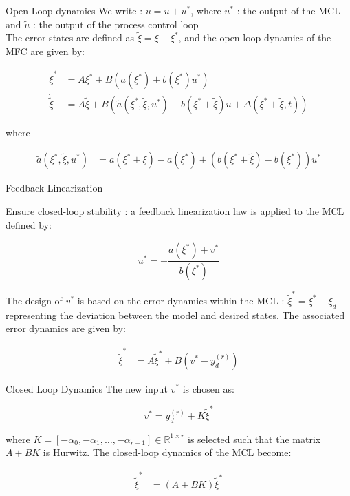 \begin{frame}{Open Loop dynamics}
    We write :  \(u = \tilde{u} + u^*\), where \(u^*\) : the output of the MCL and \(\tilde{u}\) : the output of the process control loop \\
    The error states are defined as \(\tilde{\xi} = \xi - \xi^*\), and the open-loop dynamics of the MFC are given by:

\begin{align}
\dot{\xi}^* &= A\xi^* + B \left( a(\xi^*) + b(\xi^*) u^* \right) \\
\dot{\tilde{\xi}} &= A\tilde{\xi} + B \left( \tilde{a}(\xi^*, \tilde{\xi}, u^*) + b(\xi^* + \tilde{\xi}) \tilde{u} + \Delta(\xi^* + \tilde{\xi}, t)  \right)
\end{align}

where

\begin{align}
\tilde{a}(\xi^*, \tilde{\xi}, u^*) &= a(\xi^* + \tilde{\xi}) - a(\xi^*) + \left( b(\xi^* + \tilde{\xi}) - b(\xi^*) \right) u^*
\end{align}


\end{frame}


\begin{frame}{Feedback Linearization}
    
Ensure closed-loop stability : a feedback linearization law is applied to the MCL  defined by:

\begin{equation}
\label{eq:MCL_control_law}
u^* = -\frac{a(\xi^*) + v^*}{b(\xi^*)}
\end{equation}

The design of \(v^*\) is based on the error dynamics within the MCL : \(\tilde{\xi}^* = \xi^* - \xi_d\) representing the deviation between the model and desired states. The associated error dynamics are given by:

\begin{align}
\dot{\tilde{\xi}}^* &= A\tilde{\xi}^* + B(v^* - y_d^{(r)})
\end{align}

\end{frame}



\begin{frame}{Closed Loop Dynamics}
The new input \(v^*\) is chosen as:

\begin{equation}
v^* = y_d^{(r)} + K\tilde{\xi}^*
\end{equation}

where \(K = [-\alpha_0, -\alpha_1, \ldots, -\alpha_{r-1}] \in \mathbb{R}^{1 \times r}\) is selected such that the matrix \(A + BK\) is Hurwitz. The closed-loop dynamics of the MCL become:

\begin{align}
\dot{\tilde{\xi}}^* &= (A + BK)\tilde{\xi}^*
\end{align}
\end{frame}


